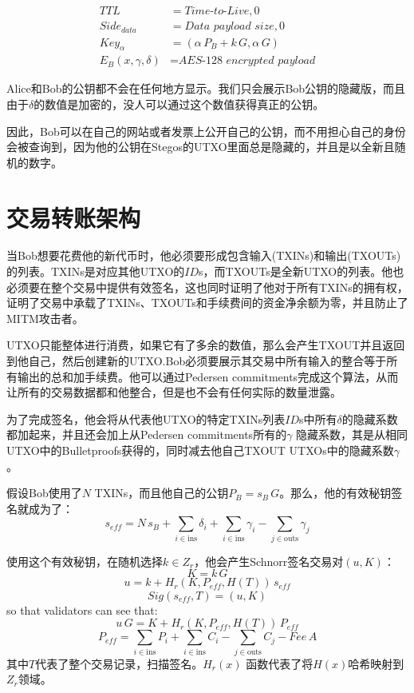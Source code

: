 \documentclass[8pt,fleqn,openany]{book}
\begin{document}
\begin{CJK*}{UTF8}{gbsn}
{\begin{align*}
TTL &= \textit{Time-to-Live}, 0 \\
Side_{data} &= \textit{Data payload size}, 0 \\
Key_{\alpha} &= (\alpha \, P_{B} + k \, G, \alpha \, G ) \\
E_B(x, \gamma, \delta) &= \textit{AES-128 encrypted payload}
\end{align*}

Alice和Bob的公钥都不会在任何地方显示。我们只会展示Bob公钥的隐藏版，而且由于$\delta$的数值是加密的，没人可以通过这个数值获得真正的公钥。

因此，Bob可以在自己的网站或者发票上公开自己的公钥，而不用担心自己的身份会被查询到，因为他的公钥在Stegos的UTXO里面总是隐藏的，并且是以全新且随机的数字。

\section{交易转账架构}
当Bob想要花费他的新代币时，他必须要形成包含输入(TXINs)和输出(TXOUTs)的列表。TXINs是对应其他UTXO的$\mathit{ID}$s，而TXOUTs是全新UTXO的列表。他也必须要在整个交易中提供有效签名，这也同时证明了他对于所有TXINs的拥有权，证明了交易中承载了TXINs、TXOUTs和手续费间的资金净余额为零，并且防止了MITM攻击者。

UTXO只能整体进行消费，如果它有了多余的数值，那么会产生TXOUT并且返回到他自己，然后创建新的UTXO.Bob必须要展示其交易中所有输入的整合等于所有输出的总和加手续费。他可以通过Pedersen commitments完成这个算法，从而让所有的交易数据都和他整合，但是也不会有任何实际的数量泄露。
 
为了完成签名，他会将从代表他UTXO的特定TXINs列表$\mathit{ID}$s中所有$\delta$的隐藏系数都加起来，并且还会加上从Pedersen commitments所有的$\gamma$ 隐藏系数，其是从相同UTXO中的Bulletproofs获得的，同时减去他自己TXOUT UTXOs中的隐藏系数$\gamma$。

假设Bob使用了$N$ TXINs，而且他自己的公钥$P_B = s_B \, G$。那么，他的有效秘钥签名就成为了：
$$s_{\mathit{eff}} = N \, s_B + \sum_{i \in \text{ins}} {\delta_i} + \sum_{i \in \text{ins}}{\gamma_i} - \sum_{j \in \text{outs}}{ \gamma_j}$$

使用这个有效秘钥，在随机选择$k \in Z_r$，他会产生Schnorr签名交易对$(u, K)$：
$$K = k \, G$$
$$u = k + H_r(K, P_{eff}, H(T)) \, s_{\mathit{eff}}$$
$$Sig(s_{eff},T) = (u, K)$$
so that validators can see that:
$$u \, G = K + H_r(K, P_{eff}, H(T)) \, P_{eff}$$
$$P_{\mathit{eff}} = \sum_{i \in \text{ins}}{P_i} + \sum_{i \in \text{ins}}{C_i} - \sum_{j \in \text{outs}}{C_j} - \mathit{Fee} \, A$$
其中$T$代表了整个交易记录，扫描签名。$H_r(x)$ 函数代表了将$H(x)$哈希映射到$Z_r$领域。

}
\end{CJK*}
\end{document}
